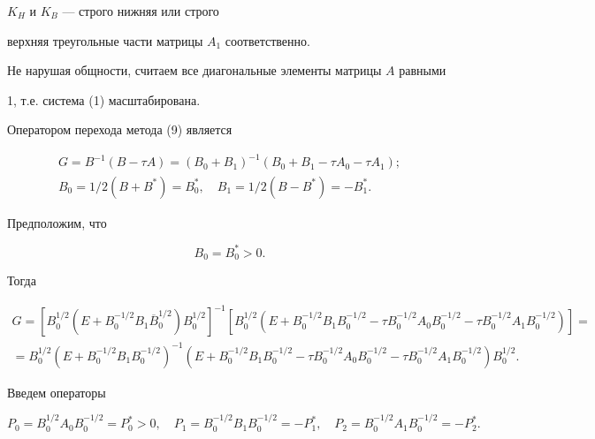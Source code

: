 $K_H$ и $K_B$ --- строго нижняя или строго 


верхняя треугольные части матрицы $A_1$ соответственно. 


 


Не нарушая общности, считаем все диагональные элементы матрицы $A$ равными 


1, т.е. система (1) масштабирована. 


 


Оператором перехода метода (9) является 


\begin{gather*} 


G=B^{-1}(B-\tau A)=(B_0+B_1)^{-1}(B_0+B_1 -\tau A_0 -\tau A_1);\\


B_0=1/2(B+B^*)=B^*_0,\quad B_1=1/2(B-B^*)=-B_1^*. 


\end{gather*} 


Предположим, что 


\begin{equation} 


B_0=B_0^* >0. 


\end{equation} 


Тогда 


\begin{gather*} 


G=[B^{1/2}_0(E+B^{-1/2}_0B_1\overline B^{1/2}_0)B_0^{1/2}]^{-1} 


[B^{1/2}_0(E+B^{-1/2}_0B_1B^{-1/2}_0-\tau B^{-1/2}_0A_0B^{-1/2}_0 


-\tau B^{-1/2}_0 A_1B^{-1/2}_0)]=\\ 


=B^{1/2}_0(E+B^{-1/2}_0 B_1 B^{-1/2}_0)^{-1} 


(E+B^{-1/2}_0 B_1 B^{-1/2}_0-\tau B^{-1/2}_0 A_0 B^{-1/2}_0 


-\tau B^{-1/2}_0 A_1 B^{-1/2}_0)B^{1/2}_0. 


\end{gather*} 


Введем операторы 


\begin{equation} 


P_0=B^{1/2}_0 A_0 B^{-1/2}_0 = P_0^* >0,\quad 


P_1 = B^{-1/2}_0 B_1 B^{-1/2}_0 = -P_1^*,\quad 


P_2 = B^{-1/2}_0 A_1 B^{-1/2}_0=-P_2^*. 


\end{equation} 


